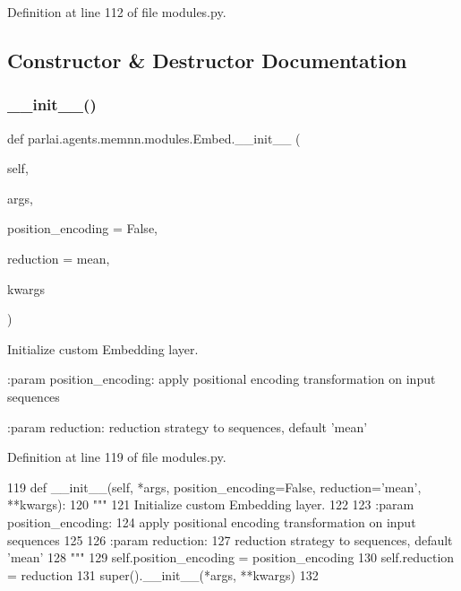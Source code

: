 Definition at line 112 of file modules.\+py.



\subsection{Constructor \& Destructor Documentation}
\mbox{\label{classparlai_1_1agents_1_1memnn_1_1modules_1_1Embed_a3d901aa67e52a3ea160b5f41acecd2c6}} 
\subsubsection{\texorpdfstring{\+\_\+\+\_\+init\+\_\+\+\_\+()}{\_\_init\_\_()}}
{\footnotesize\ttfamily def parlai.\+agents.\+memnn.\+modules.\+Embed.\+\_\+\+\_\+init\+\_\+\+\_\+ (\begin{DoxyParamCaption}\item[{}]{self,  }\item[{}]{args,  }\item[{}]{position\+\_\+encoding = {\ttfamily False},  }\item[{}]{reduction = {\ttfamily \textquotesingle{}mean\textquotesingle{}},  }\item[{}]{kwargs }\end{DoxyParamCaption})}

\begin{DoxyVerb}Initialize custom Embedding layer.

:param position_encoding:
    apply positional encoding transformation on input sequences

:param reduction:
    reduction strategy to sequences, default 'mean'
\end{DoxyVerb}
 

Definition at line 119 of file modules.\+py.


\begin{DoxyCode}
119     \textcolor{keyword}{def }\_\_init\_\_(self, *args, position\_encoding=False, reduction='mean', **kwargs):
120         \textcolor{stringliteral}{"""}
121 \textcolor{stringliteral}{        Initialize custom Embedding layer.}
122 \textcolor{stringliteral}{}
123 \textcolor{stringliteral}{        :param position\_encoding:}
124 \textcolor{stringliteral}{            apply positional encoding transformation on input sequences}
125 \textcolor{stringliteral}{}
126 \textcolor{stringliteral}{        :param reduction:}
127 \textcolor{stringliteral}{            reduction strategy to sequences, default 'mean'}
128 \textcolor{stringliteral}{        """}
129         self.position\_encoding = position\_encoding
130         self.reduction = reduction
131         super().\_\_init\_\_(*args, **kwargs)
132 
\end{DoxyCode}


